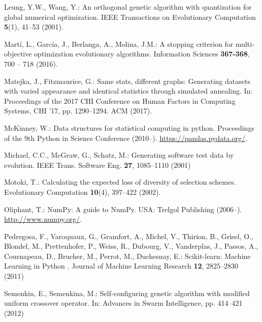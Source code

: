 \documentclass[smallextended]{svjour3}
\begin{document}
\begin{thebibliography}{10}
Leung, Y.W., Wang, Y.: An orthogonal genetic algorithm with quantization for
  global numerical optimization.
\newblock IEEE Transactions on Evolutionary Computation \textbf{5}(1), 41--53
  (2001).
\newblock {}

Mart{\'i}, L., Garc{\'i}a, J., Berlanga, A., Molina, J.M.: A stopping criterion
  for multi-objective optimization evolutionary algorithms.
\newblock Information Sciences \textbf{367-368}, 700 -- 718 (2016).
\newblock {}

Matejka, J., Fitzmaurice, G.: Same stats, different graphs: Generating datasets
  with varied appearance and identical statistics through simulated annealing.
\newblock In: Proceedings of the 2017 CHI Conference on Human Factors in
  Computing Systems, CHI '17, pp. 1290--1294. ACM (2017).
\newblock {}

McKinney, W.: Data structures for statistical computing in python.
\newblock Proceedings of the 9th Python in Science Conference (2010--).
\newblock \urlprefix\url{https://pandas.pydata.org/}.

Michael, C.C., McGraw, G., Schatz, M.: Generating software test data by
  evolution.
\newblock IEEE Trans. Software Eng. \textbf{27}, 1085--1110 (2001)

Motoki, T.: Calculating the expected loss of diversity of selection schemes.
\newblock Evolutionary Computation \textbf{10}(4), 397--422 (2002).
\newblock {}

Oliphant, T.: {NumPy}: A guide to {NumPy}.
\newblock USA: Trelgol Publishing (2006--).
\newblock \urlprefix\url{http://www.numpy.org/}.

Pedregosa, F., Varoquaux, G., Gramfort, A., Michel, V., Thirion, B., Grisel,
  O., Blondel, M., Prettenhofer, P., Weiss, R., Dubourg, V., Vanderplas, J.,
  Passos, A., Cournapeau, D., Brucher, M., Perrot, M., Duchesnay, E.:
  {Scikit-learn: Machine Learning in Python }.
\newblock Journal of Machine Learning Research \textbf{12}, 2825--2830 (2011)

Semenkin, E., Semenkina, M.: Self-configuring genetic algorithm with modified
  uniform crossover operator.
\newblock In: Advances in Swarm Intelligence, pp. 414--421 (2012)


\end{thebibliography}
\end{document}
